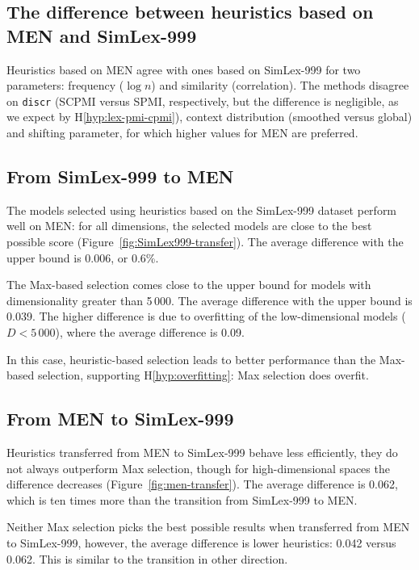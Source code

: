 \subsection{The difference between heuristics based on MEN and SimLex-999}

Heuristics based on MEN agree with ones based on SimLex-999 for two parameters: frequency ($\log n$) and similarity (correlation). The methods disagree on \texttt{discr} (SCPMI versus SPMI, respectively, but the difference is negligible, as we expect by H\ref{hyp:lex-pmi-cpmi}), context distribution (smoothed versus global) and shifting parameter, for which higher values for MEN are preferred.

\subsection{From SimLex-999 to MEN}
\label{sec:simlex-men}



The models selected using heuristics based on the SimLex-999 dataset perform well on MEN: for all dimensions, the selected models are close to the best possible score (Figure~\ref{fig:SimLex999-transfer}). The average difference with the upper bound is 0.006, or 0.6\%.

The Max-based selection comes close to the upper bound for models with dimensionality greater than 5\,000. The average difference with the upper bound is 0.039. The higher difference is due to overfitting of the low-dimensional models ($D < 5\,000$), where the average difference is 0.09.

In this case, heuristic-based selection leads to better performance than the Max-based selection, supporting H\ref{hyp:overfitting}: Max selection does overfit.

\subsection{From MEN to SimLex-999}

Heuristics transferred from MEN to SimLex-999 behave less efficiently, they do not always outperform Max selection, though for high-dimensional spaces the difference decreases (Figure~\ref{fig:men-transfer}). The average difference is 0.062, which is ten times more than the transition from SimLex-999 to MEN.

Neither Max selection picks the best possible results when transferred from MEN to SimLex-999, however, the average difference is lower heuristics: 0.042 versus  0.062. This is similar to the transition in other direction.

